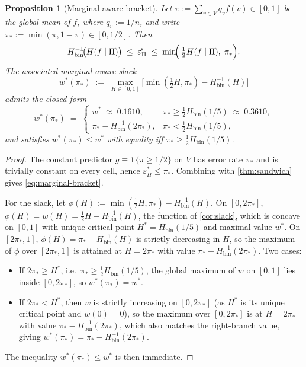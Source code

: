 \documentclass[10pt]{article}
\newtheorem{proposition}[theorem]{Proposition}
\theoremstyle{definition}
\theoremstyle{remark}
\newcommand{\Hbin}{H_{\mathrm{bin}}}
\newcommand{\Hinv}{H_{\mathrm{bin}}^{-1}}
\newcommand{\eps}{\varepsilon}
\newcommand{\epsP}{\eps^{\!*}_{\Pi}}
\begin{document}
\begin{proposition}[Marginal-aware bracket]\label{prop:marginal}
Let $\pi := \sum_{v \in V} q_{v} f(v) \in [0, 1]$ be the global
mean of $f$, where $q_{v} := 1/n$, and write
$\pi_{*} := \min(\pi, 1 - \pi) \in [0, 1/2]$. Then
\begin{equation}\label{eq:marginal-bracket}
  \Hinv\!\bigl(H(f \mid \Pi)\bigr)
  \;\le\; \epsP \;\le\;
  \min\!\Bigl(\,\tfrac{1}{2}H(f \mid \Pi),\;\pi_{*}\Bigr).
\end{equation}
The associated marginal-aware slack
\[
  w^{*}(\pi_{*}) \;:=\; \max_{H \in [0,1]}
   \bigl[\min(\tfrac{1}{2}H, \pi_{*}) - \Hinv(H)\bigr]
\]
admits the closed form
\begin{equation}\label{eq:marginal-slack}
  w^{*}(\pi_{*}) \;=\;
  \begin{cases}
    w^{*} \;\approx\; 0.1610, & \pi_{*} \ge \tfrac{1}{2}\Hbin(1/5)
       \;\approx\; 0.3610,\\[4pt]
    \pi_{*} - \Hinv(2\pi_{*}), & \pi_{*} < \tfrac{1}{2}\Hbin(1/5),
  \end{cases}
\end{equation}
and satisfies $w^{*}(\pi_{*}) \le w^{*}$ with equality iff
$\pi_{*} \ge \tfrac{1}{2}\Hbin(1/5)$.
\end{proposition}

\begin{proof}
The constant predictor $g \equiv \mathbf{1}\{\pi \ge 1/2\}$ on
$V$ has error rate $\pi_{*}$ and is trivially constant on every
cell, hence $\epsP \le \pi_{*}$. Combining with
\cref{thm:sandwich} gives \eqref{eq:marginal-bracket}.

For the slack, let $\phi(H) := \min(\tfrac{1}{2}H, \pi_{*}) - \Hinv(H)$.
On $[0, 2\pi_{*}]$, $\phi(H) = w(H) = \tfrac{1}{2}H - \Hinv(H)$,
the function of \cref{cor:slack}, which is concave on $[0, 1]$
with unique critical point $H^{*} = \Hbin(1/5)$ and maximal
value $w^{*}$. On $[2\pi_{*}, 1]$, $\phi(H) = \pi_{*} - \Hinv(H)$
is strictly decreasing in $H$, so the maximum of $\phi$ over
$[2\pi_{*}, 1]$ is attained at $H = 2\pi_{*}$ with value
$\pi_{*} - \Hinv(2\pi_{*})$. Two cases:
\begin{itemize}
  \item If $2\pi_{*} \ge H^{*}$, i.e.\ $\pi_{*} \ge \tfrac{1}{2}\Hbin(1/5)$,
    the global maximum of $w$ on $[0, 1]$ lies inside
    $[0, 2\pi_{*}]$, so $w^{*}(\pi_{*}) = w^{*}$.
  \item If $2\pi_{*} < H^{*}$, then $w$ is strictly increasing on
    $[0, 2\pi_{*}]$ (as $H^{*}$ is its unique critical point and
    $w(0) = 0$), so the maximum over $[0, 2\pi_{*}]$ is at
    $H = 2\pi_{*}$ with value $\pi_{*} - \Hinv(2\pi_{*})$, which
    also matches the right-branch value, giving
    $w^{*}(\pi_{*}) = \pi_{*} - \Hinv(2\pi_{*})$.
\end{itemize}
The inequality $w^{*}(\pi_{*}) \le w^{*}$ is then immediate.
\end{proof}
\end{document}

